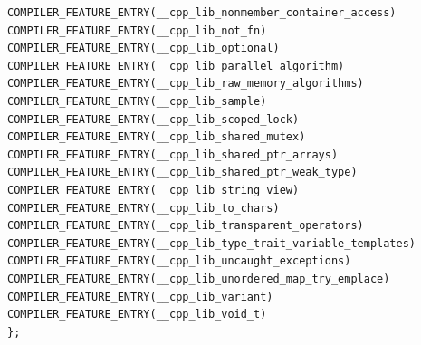 \begin{lstlisting}[style=styleCXX]
COMPILER_FEATURE_ENTRY(__cpp_lib_nonmember_container_access)
COMPILER_FEATURE_ENTRY(__cpp_lib_not_fn)
COMPILER_FEATURE_ENTRY(__cpp_lib_optional)
COMPILER_FEATURE_ENTRY(__cpp_lib_parallel_algorithm)
COMPILER_FEATURE_ENTRY(__cpp_lib_raw_memory_algorithms)
COMPILER_FEATURE_ENTRY(__cpp_lib_sample)
COMPILER_FEATURE_ENTRY(__cpp_lib_scoped_lock)
COMPILER_FEATURE_ENTRY(__cpp_lib_shared_mutex)
COMPILER_FEATURE_ENTRY(__cpp_lib_shared_ptr_arrays)
COMPILER_FEATURE_ENTRY(__cpp_lib_shared_ptr_weak_type)
COMPILER_FEATURE_ENTRY(__cpp_lib_string_view)
COMPILER_FEATURE_ENTRY(__cpp_lib_to_chars)
COMPILER_FEATURE_ENTRY(__cpp_lib_transparent_operators)
COMPILER_FEATURE_ENTRY(__cpp_lib_type_trait_variable_templates)
COMPILER_FEATURE_ENTRY(__cpp_lib_uncaught_exceptions)
COMPILER_FEATURE_ENTRY(__cpp_lib_unordered_map_try_emplace)
COMPILER_FEATURE_ENTRY(__cpp_lib_variant)
COMPILER_FEATURE_ENTRY(__cpp_lib_void_t)
};


\end{lstlisting}
